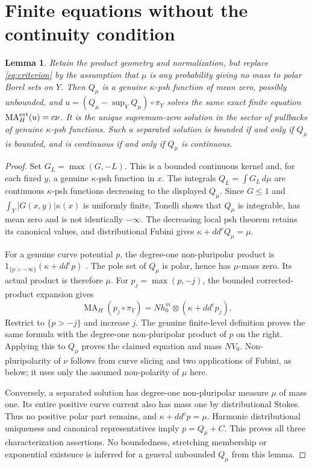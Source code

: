 \documentclass[11pt]{article}
\newcommand{\ddc}{dd^c}
\newcommand{\MA}{\operatorname{MA}}
\newtheorem{lemma}[theorem]{Lemma}
\theoremstyle{remark}\newtheorem{remark}[theorem]{Remark}
\begin{document}
\section{Finite equations without the continuity condition}
\begin{lemma}\label{lem:arbitrary}
Retain the product geometry and normalization, but replace
\eqref{eq:criterion} by the assumption that $\mu$ is any probability
giving no mass to polar Borel sets on $Y$. Then $Q_\mu$ is a genuine
$\kappa$-psh function of mean zero, possibly unbounded, and
$u=(Q_\mu-\sup_YQ_\mu)\circ\pi_Y$ solves the same exact finite equation
$\MA_H^{\rm ext}(u)=c\nu$. It is the unique supremum-zero solution in
the sector of pullbacks of genuine $\kappa$-psh functions.
Such a separated solution is bounded if and only if $Q_\mu$ is bounded,
and is continuous if and only if $Q_\mu$ is continuous.
\end{lemma}
\begin{proof}
Set $G_L=\max(G,-L)$. This is a bounded continuous kernel and, for
each fixed $y$, a genuine $\kappa$-psh function in $x$. The integrals
$Q_L=\int G_L\,d\mu$ are continuous $\kappa$-psh functions decreasing
to the displayed $Q_\mu$. Since $G\leq1$ and
$\int_Y|G(x,y)|\kappa(x)$ is uniformly finite, Tonelli shows that
$Q_\mu$ is integrable, has mean zero and is not identically $-\infty$.
The decreasing local psh theorem retains its canonical values, and
distributional Fubini gives $\kappa+\ddc Q_\mu=\mu$.

For a genuine curve potential $p$, the degree-one non-pluripolar
product is $1_{\{p>-\infty\}}(\kappa+\ddc p)$
\cite[Section 1.2]{BEGZ}. The pole set of $Q_\mu$ is polar, hence has
$\mu$-mass zero. Its actual product is therefore $\mu$.
For $p_j=\max(p,-j)$, the bounded corrected-product expansion gives
\[
 \MA_H(p_j\circ\pi_Y)=N h_0^m\otimes(\kappa+\ddc p_j).
\]
Restrict to $\{p>-j\}$ and increase $j$. The genuine finite-level
definition proves the same formula with the degree-one non-pluripolar
product of $p$ on the right. Applying this to $Q_\mu$ proves the
claimed equation and mass $NV_0$. Non-pluripolarity of $\nu$ follows
from curve slicing and two applications of Fubini, as below; it uses
only the assumed non-polarity of $\mu$ here.

Conversely, a separated solution has degree-one non-pluripolar
measure $\mu$ of mass one. Its entire positive curve current also
has mass one by distributional Stokes. Thus no positive polar part
remains, and $\kappa+\ddc p=\mu$. Harmonic distributional uniqueness
and canonical representatives imply $p=Q_\mu+C$. This proves all
three characterization assertions. No boundedness, stretching
membership or exponential existence is inferred for a general
unbounded $Q_\mu$ from this lemma.
\end{proof}
\end{document}
